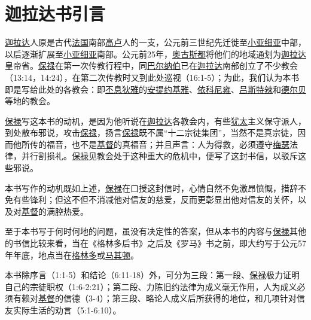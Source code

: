 \chapter*{迦拉达书引言}


\uline{迦拉达}人原是古代\uline{法国}南部\uline{高卢}人的一支，公元前三世纪先迁徙至\uline{小亚细亚}中部，以后逐渐扩展至\uline{小亚细亚}南部。公元前25年，\uline{奥古斯都}将他们的地域通划为\uline{迦拉达}皇帝省。\uline{保禄}在第一次传教行程中，同\uline{巴尔纳伯}已在\uline{迦拉达}南部创立了不少教会（13:14，14:24），在第二次传教时又到此处巡视（16:1-5）；为此，我们认为本书即是写给此处的各教会：即\uline{丕息狄雅}的\uline{安提约基雅}、\uline{依科尼雍}、\uline{吕斯特辣}和\uline{德尔贝}等地的教会。

\uline{保禄}写这本书的动机，是因为他听说在\uline{迦拉达}各教会内，有些\uline{犹太}主义保守派人，到处散布邪说，攻击\uline{保禄}，扬言\uline{保禄}既不属“十二宗徒集团”，当然不是真宗徒，因而他所传的福音，也不是\uline{基督}的真福音；并且声言：人为得救，必须遵守\uline{梅瑟}法律，并行割损礼。\uline{保禄}见教会处于这种重大的危机中，便写了这封书信，以驳斥这些邪说。

本书写作的动机既如上述，\uline{保禄}在口授这封信时，心情自然不免激昂愤慨，措辞不免有些锋利；但这不但不消减他对信友的慈爱，反而更彰显出他对信友的关怀，以及对\uline{基督}的满腔热爱。

至于本书写于何时何地的问题，虽没有决定性的答案，但从本书的内容与\uline{保禄}其他的书信比较来看，当在《格林多后书》之后及《罗马》书之前，即大约写于公元57年年底，地点当在\uline{格林多}或\uline{马其顿}。

本书除序言（1:1-5）和结论（6:11-18）外，可分为三段：第一段、\uline{保禄}极力证明自己的宗徒职权（1:6-2:21）；第二段、力陈旧约法律为成义毫无作用，人为成义必须有赖对\uline{基督}的信德（3-4）；第三段、略论人成义后所获得的地位，和几项针对信友实际生活的劝言（5:1-6:10）。